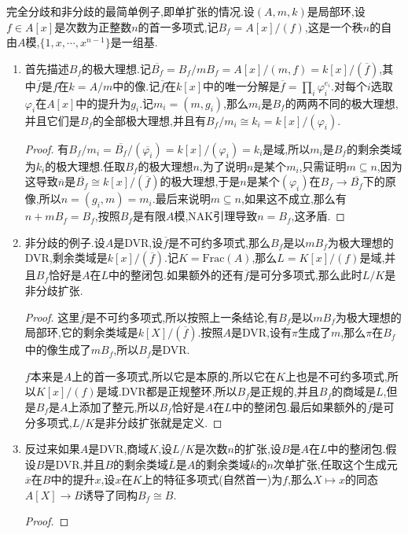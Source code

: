 完全分歧和非分歧的最简单例子,即单扩张的情况.设$(A,m,k)$是局部环,设$f\in A[x]$是次数为正整数$n$的首一多项式,记$B_f=A[x]/(f)$,这是一个秩$n$的自由$A$模,$\{1,x,\cdots,x^{n-1}\}$是一组基.
\begin{enumerate}
	\item 首先描述$B_f$的极大理想.记$\overline{B_f}=B_f/mB_f=A[x]/(m,f)=k[x]/(\overline{f})$,其中$\overline{f}$是$f$在$k=A/m$中的像.记$\overline{f}$在$k[x]$中的唯一分解是$\overline{f}=\prod_i\varphi_i^{e_i}$.对每个$i$选取$\varphi_i$在$A[x]$中的提升为$g_i$.记$m_i=(m,g_i)$,那么$m_i$是$B_f$的两两不同的极大理想,并且它们是$B_f$的全部极大理想,并且有$B_f/m_i\cong k_i=k[x]/(\varphi_i)$.
	\begin{proof}
		
		有$B_f/m_i=\overline{B_f}/(\overline{\varphi_i})=k[x]/(\varphi_i)=k_i$是域,所以$m_i$是$B_f$的剩余类域为$k_i$的极大理想.任取$B_f$的极大理想$n$,为了说明$n$是某个$m_i$,只需证明$m\subseteq n$,因为这导致$\overline{n}$是$\overline{B_f}\cong k[x]/(\overline{f})$的极大理想,于是$n$是某个$(\varphi_i)$在$B_f\to\overline{B_f}$下的原像,所以$n=(g_i,m)=m_i$.最后来说明$m\subseteq n$,如果这不成立,那么有$n+mB_f=B_f$,按照$B_f$是有限$A$模,NAK引理导致$n=B_f$,这矛盾.
	\end{proof}
	\item 非分歧的例子.设$A$是DVR,设$\overline{f}$是不可约多项式,那么$B_f$是以$mB_f$为极大理想的DVR,剩余类域是$k[x]/(\overline{f})$.记$K=\mathrm{Frac}(A)$,那么$L=K[x]/(f)$是域,并且$B_f$恰好是$A$在$L$中的整闭包.如果额外的还有$\overline{f}$是可分多项式,那么此时$L/K$是非分歧扩张.
	\begin{proof}
		
		这里$\overline{f}$是不可约多项式,所以按照上一条结论,有$B_f$是以$mB_f$为极大理想的局部环,它的剩余类域是$k[X]/(\overline{f})$.按照$A$是DVR,设有$\pi$生成了$m$,那么$\pi$在$B_f$中的像生成了$mB_f$,所以$B_f$是DVR.
		
		\qquad
		
		$f$本来是$A$上的首一多项式,所以它是本原的,所以它在$K$上也是不可约多项式,所以$K[x]/(f)$是域.DVR都是正规整环,所以$B_f$是正规的,并且$B_f$的商域是$L$,但是$B_f$是$A$上添加了整元,所以$B_f$恰好是$A$在$L$中的整闭包.最后如果额外的$\overline{f}$是可分多项式,$L/K$是非分歧扩张就是定义.
	\end{proof}
	\item 反过来如果$A$是DVR,商域$K$,设$L/K$是次数$n$的扩张,设$B$是$A$在$L$中的整闭包.假设$B$是DVR,并且$B$的剩余类域$\overline{L}$是$A$的剩余类域$k$的$n$次单扩张,任取这个生成元$\overline{x}$在$B$中的提升$x$,设$x$在$K$上的特征多项式(自然首一)为$f$,那么$X\mapsto x$的同态$A[X]\to B$诱导了同构$B_f\cong B$.
	\begin{proof}
		

\end{proof}
\end{enumerate}
